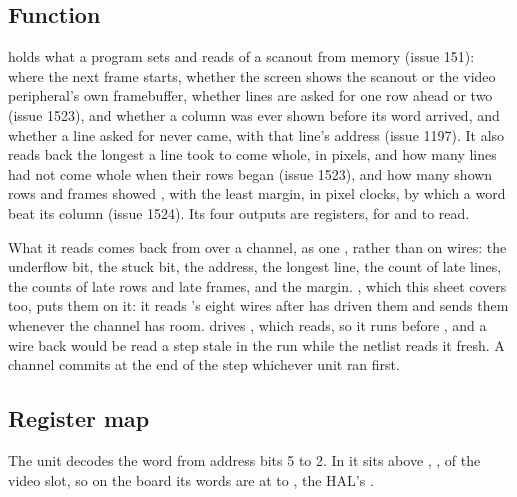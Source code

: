 
%
{}%
{}

\subsection*{Function}

 holds what a program sets and reads of a scanout from
memory (issue 151): where the next frame starts, whether the screen
shows the scanout or the video peripheral's own framebuffer, whether
lines are asked for one row ahead or two (issue 1523), and whether a
column was ever shown before its word arrived, and whether a line
asked for never came, with that line's address (issue 1197). It also
reads back the longest a line took to come whole, in pixels, and how
many lines had not come whole when their rows began (issue 1523), and
how many shown rows and frames showed , with the least
margin, in pixel clocks, by which a word beat its column (issue 1524).
Its four outputs are registers, for  and
 to read.

What it reads comes back from  over a channel, as one
, rather than on wires: the underflow bit, the stuck
bit, the address, the longest line, the count of late lines, the
counts of late rows and late frames, and the margin.
, which this sheet covers too, puts them on it: it reads
's eight wires after  has driven them and
sends them whenever the channel has room.  drives
, which  reads, so it runs before
, and a wire back would be read a step stale in the run
while the netlist reads it fresh. A channel commits at the end of the
step whichever unit ran first.

\subsection*{Register map}

The unit decodes the word from address bits 5 to 2. In
 it sits above , , of
the video slot, so on the board its words are at  to
, the HAL's .

